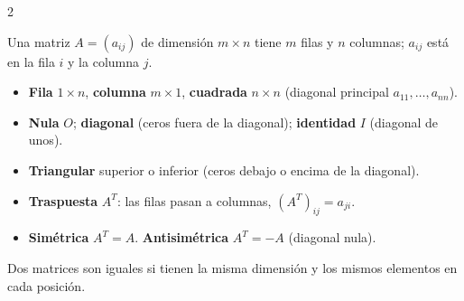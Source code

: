 \documentclass[10pt]{article}
\begin{document}
\begin{multicols}{2}

Una matriz \(A=(a_{ij})\) de dimensión \(m\times n\) tiene \(m\) filas y \(n\) columnas; \(a_{ij}\) está en la fila \(i\) y la columna \(j\).
\begin{itemize}
  \item \textbf{Fila} \(1\times n\), \textbf{columna} \(m\times1\), \textbf{cuadrada} \(n\times n\) (diagonal principal \(a_{11},\dots,a_{nn}\)).
  \item \textbf{Nula} \(O\); \textbf{diagonal} (ceros fuera de la diagonal); \textbf{identidad} \(I\) (diagonal de unos).
  \item \textbf{Triangular} superior o inferior (ceros debajo o encima de la diagonal).
  \item \textbf{Traspuesta} \(A^T\): las filas pasan a columnas, \((A^T)_{ij}=a_{ji}\).
  \item \textbf{Simétrica} \(A^T=A\). \textbf{Antisimétrica} \(A^T=-A\) (diagonal nula).
\end{itemize}
Dos matrices son iguales si tienen la misma dimensión y los mismos elementos en cada posición.


\end{multicols}
\end{document}
